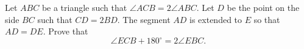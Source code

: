Let $ABC$ be a triangle such that $\angle ACB = 2\angle ABC$. Let $D$ be the point on the side $BC$ such that $CD = 2BD$. The segment $AD$ is extended to $E$ so that $AD = DE$. Prove that
\[ \angle ECB + 180^{\circ} = 2\angle EBC. \]

